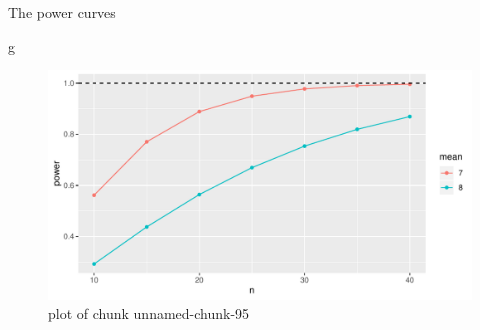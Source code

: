 \documentclass[ignorenonframetext,]{beamer}
\newenvironment{Shaded}{\begin{snugshade}}{\end{snugshade}}
\newcommand{\NormalTok}[1]{#1}
\begin{document}
\begin{frame}[fragile]{The power curves}
\protect\hypertarget{the-power-curves-1}{}

\begin{Shaded}
\begin{Highlighting}[]
\NormalTok{g}
\end{Highlighting}
\end{Shaded}

\begin{figure}
\centering
\includegraphics{figure/unnamed-chunk-95-1.pdf}
\caption{plot of chunk unnamed-chunk-95}
\end{figure}

\end{frame}
\end{document}
